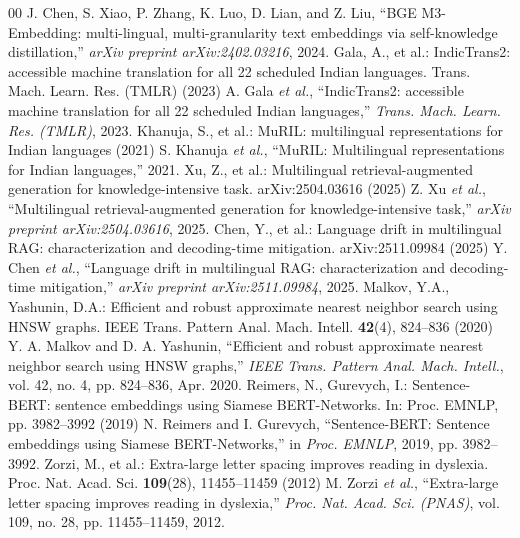 \begin{thebibliography}{00}
\else{} J. Chen, S. Xiao, P. Zhang, K. Luo, D. Lian, and Z. Liu, ``BGE M3-Embedding: multi-lingual, multi-granularity text embeddings via self-knowledge distillation,'' \textit{arXiv preprint arXiv:2402.03216}, 2024.\fi
\ifspringer{} Gala, A., et al.: IndicTrans2: accessible machine translation for all 22 scheduled Indian languages. Trans. Mach. Learn. Res. (TMLR) (2023)
\else{} A. Gala \textit{et al.}, ``IndicTrans2: accessible machine translation for all 22 scheduled Indian languages,'' \textit{Trans. Mach. Learn. Res. (TMLR)}, 2023.\fi
\ifspringer{} Khanuja, S., et al.: MuRIL: multilingual representations for Indian languages (2021)
\else{} S. Khanuja \textit{et al.}, ``MuRIL: Multilingual representations for Indian languages,'' 2021.\fi
\ifspringer{} Xu, Z., et al.: Multilingual retrieval-augmented generation for knowledge-intensive task. arXiv:2504.03616 (2025)
\else{} Z. Xu \textit{et al.}, ``Multilingual retrieval-augmented generation for knowledge-intensive task,'' \textit{arXiv preprint arXiv:2504.03616}, 2025.\fi
\ifspringer{} Chen, Y., et al.: Language drift in multilingual RAG: characterization and decoding-time mitigation. arXiv:2511.09984 (2025)
\else{} Y. Chen \textit{et al.}, ``Language drift in multilingual RAG: characterization and decoding-time mitigation,'' \textit{arXiv preprint arXiv:2511.09984}, 2025.\fi
\ifspringer{} Malkov, Y.A., Yashunin, D.A.: Efficient and robust approximate nearest neighbor search using HNSW graphs. IEEE Trans. Pattern Anal. Mach. Intell. \textbf{42}(4), 824--836 (2020)
\else{} Y. A. Malkov and D. A. Yashunin, ``Efficient and robust approximate nearest neighbor search using HNSW graphs,'' \textit{IEEE Trans. Pattern Anal. Mach. Intell.}, vol. 42, no. 4, pp. 824--836, Apr. 2020.\fi
\ifspringer{} Reimers, N., Gurevych, I.: Sentence-BERT: sentence embeddings using Siamese BERT-Networks. In: Proc. EMNLP, pp. 3982--3992 (2019)
\else{} N. Reimers and I. Gurevych, ``Sentence-BERT: Sentence embeddings using Siamese BERT-Networks,'' in \textit{Proc. EMNLP}, 2019, pp. 3982--3992.\fi
\ifconf\else  %
\ifspringer{} Zorzi, M., et al.: Extra-large letter spacing improves reading in dyslexia. Proc. Nat. Acad. Sci. \textbf{109}(28), 11455--11459 (2012)
\else{} M. Zorzi \textit{et al.}, ``Extra-large letter spacing improves reading in dyslexia,'' \textit{Proc. Nat. Acad. Sci. (PNAS)}, vol. 109, no. 28, pp. 11455--11459, 2012.\fi

\end{thebibliography}
